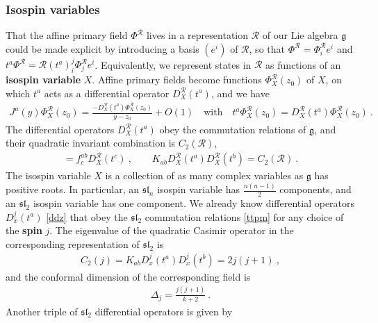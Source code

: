 \documentclass[12pt, a4paper, notitlepage, twoside]{report}
\numberwithin{equation}{section}
\theoremstyle{break}
\begin{document}
\subsubsection{Isospin variables}

That the affine primary field $\Phi^\mathcal{R}$ lives in a representation $\mathcal{R}$ of our Lie algebra $\mathfrak{g}$ could be made explicit by introducing  a basis $(e^i)$ of $\mathcal{R}$, so that $\Phi^{\mathcal{R}} = \Phi^{\mathcal{R}}_ie^i$ and $t^a \Phi^{\mathcal{R}} = \mathcal{R}(t^a)_i^j \Phi^{\mathcal{R}}_je^i$.
Equivalently, we represent states in $\mathcal{R}$ 
as functions of an \textbf{\boldmath isospin variable} $X$. 
Affine primary fields become functions $\Phi^\mathcal{R}_X(z_0)$ of $X$, on which $t^a$ acts as a differential operator $D_X^\mathcal{R}(t^a)$, 
and we have
\begin{align}
 J^a(y)\Phi^\mathcal{R}_X(z_0) = \frac{-D^\mathcal{R}_X(t^a)\Phi^\mathcal{R}_X(z_0)}{y-z_0}+O(1)\quad \text{with} \quad t^a \Phi^\mathcal{R}_X(z_0) = D_X^\mathcal{R}(t^a) \Phi^\mathcal{R}_X(z_0)\ .
\label{jprx}
\end{align}
The differential operators $D_X^\mathcal{R}(t^a)$ obey the commutation relations of $\mathfrak{g}$, and their quadratic invariant combination is $C_2(\mathcal{R})$,
\begin{align}
[D_X^\mathcal{R}(t^a),D_X^\mathcal{R}(t^b)] = f^{ab}_c D_X^\mathcal{R}(t^c)\ , \qquad K_{ab} D_X^\mathcal{R}(t^a)D_X^\mathcal{R}(t^b) = C_2(\mathcal{R})\ .
\label{dta}
\end{align}
The isospin variable $X$ is a collection of as many complex variables as $\mathfrak{g}$ has positive roots.
In particular, an $\mathfrak{sl}_n$ isospin variable has $\frac{n(n-1)}{2}$ components, and an $\mathfrak{sl}_2$ isospin variable has one component.
We already know differential operators $D^j_x(t^a)$ \eqref{ddz} that 
obey the $\mathfrak{sl}_2$ commutation relations \eqref{ttpm} for any choice of the 
\textbf{\boldmath spin} $j$.
The eigenvalue of the quadratic Casimir operator in the corresponding representation of $\mathfrak{sl}_2$ is
\begin{align}
 C_2(j) =  K_{ab}D_x^j(t^a)D_x^j(t^b) = 2j(j+1)\ ,
\end{align}
and the conformal dimension of the corresponding field is
\begin{align}
 \Delta_j =\frac{j(j+1)}{k+2}\ .
\label{dj}
\end{align}
Another triple of $\mathfrak{sl}_2$ differential operators is given by 
\end{document}
